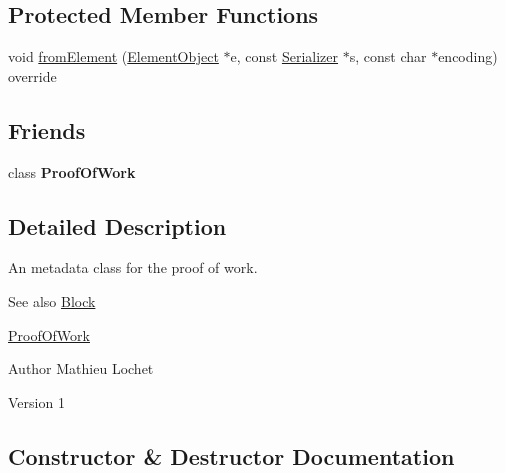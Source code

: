 \subsection*{Protected Member Functions}
\begin{DoxyCompactItemize}
\item 
void \mbox{\hyperlink{classProofOfWorkMetadata_afac533eee3123bce72615ab90f7c9669}{from\+Element}} (\mbox{\hyperlink{classElementObject}{Element\+Object}} $\ast$e, const \mbox{\hyperlink{classSerializer}{Serializer}} $\ast$s, const char $\ast$encoding) override
\end{DoxyCompactItemize}
\subsection*{Friends}
\begin{DoxyCompactItemize}
\item 
\mbox{\label{classProofOfWorkMetadata_a5493b64dfe8bc707452f326c6ec29f14}} 
class {\bfseries Proof\+Of\+Work}
\end{DoxyCompactItemize}


\subsection{Detailed Description}
An metadata class for the proof of work. \begin{DoxySeeAlso}{See also}
\mbox{\hyperlink{classBlock}{Block}} 

\mbox{\hyperlink{classProofOfWork}{Proof\+Of\+Work}}
\end{DoxySeeAlso}
\begin{DoxyAuthor}{Author}
Mathieu Lochet 
\end{DoxyAuthor}
\begin{DoxyVersion}{Version}
1 
\end{DoxyVersion}


\subsection{Constructor \& Destructor Documentation}
\mbox{\label{classProofOfWorkMetadata_a8fe975e4a12a0782becb25d1d5683a21}} 
